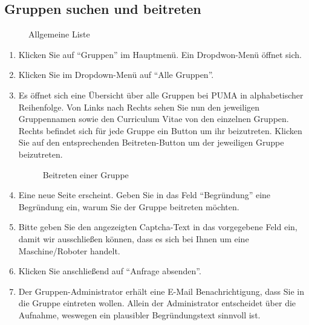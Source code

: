 \subsection{Gruppen suchen und beitreten}
\begin{figure}[h!]
 \centering
 \caption{Allgemeine Liste}
 \label{figure060}
\end{figure}
\begin{enumerate}
    \item Klicken Sie auf \enquote{Gruppen} im Hauptmenü. Ein Dropdwon-Menü öffnet sich.
    \item Klicken Sie im Dropdown-Menü auf \enquote{Alle Gruppen}.
    \item Es öffnet sich eine Übersicht über alle Gruppen bei PUMA in alphabetischer Reihenfolge. Von Links nach Rechts sehen Sie nun den jeweiligen Gruppennamen sowie den Curriculum Vitae von den einzelnen Gruppen. Rechts befindet sich für jede Gruppe ein Button um ihr beizutreten. Klicken Sie auf den entsprechenden Beitreten-Button um der jeweiligen Gruppe beizutreten.
\begin{figure}[h!]
 \centering
 \caption{Beitreten einer Gruppe}
 \label{figure061}
\end{figure}
    \item Eine neue Seite erscheint. Geben Sie in das Feld \enquote{Begründung} eine Begründung ein, warum Sie der Gruppe beitreten möchten.
    \item Bitte geben Sie den angezeigten Captcha-Text in das vorgegebene Feld ein, damit wir ausschließen können, dass es sich bei Ihnen um eine Maschine/Roboter handelt.
    \item Klicken Sie anschließend auf \enquote{Anfrage absenden}.
    \item Der Gruppen-Administrator erhält eine E-Mail Benachrichtigung, dass Sie in die Gruppe eintreten wollen. Allein der Administrator entscheidet über die Aufnahme, weswegen ein plausibler Begründungstext sinnvoll ist.
\end{enumerate}
